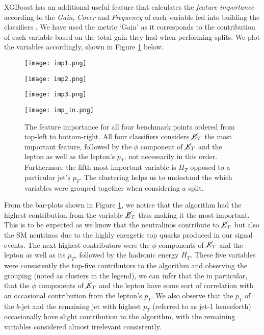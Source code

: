 XGBoost has an additional useful feature that calculates the \textit{feature importance} according to the \textit{Gain}, \textit{Cover} and \textit{Frequency} of each variable fed into building the classifiers \cite{xgboost}. We have used the metric `Gain' as it corresponds to the contribution of each variable based on the total gain they had when performing splits. We plot the variables accordingly, shown in Figure \ref{fig:imps} below. \\

\begin{figure}[htbp]
\centering
  \begin{minipage}[htbp]{0.49\textwidth}
    \centering
    \texttt{[image: imp1.png]}
  \end{minipage}
  \hfill
  \begin{minipage}[htbp]{0.49\textwidth}
    \centering
    \texttt{[image: imp2.png]}
  \end{minipage}
  \hfill
  \begin{minipage}[htbp]{0.49\textwidth}
    \centering
    \texttt{[image: imp3.png]}
  \end{minipage}
  \hfill
  \begin{minipage}[htbp]{0.49\textwidth}
    \centering
    \texttt{[image: imp\_in.png]}
  \end{minipage}
  \caption{The feature importance for all four benchmark points ordered from top-left to bottom-right. All four classifiers considers $\cancel{\it{E}}_{T}$ the most important feature, followed by the $\phi$ component of $\cancel{\it{E}}_{T}$ and the lepton as well as the lepton's $p_T$, not necessarily in this order. Furthermore the fifth most important variable is $H_T$ opposed to a particular jet's $p_T$. The clustering helps us to undestand the which variables were grouped together when considering a split.}
  \label{fig:imps}
\end{figure}

From the bar-plots shown in Figure \ref{fig:imps}, we notice that the algorithm had the highest contribution from the variable $\cancel{\it{E}}_{T}$ thus making it the most important. This is to be expected as we know that the neutralinos contribute to $\cancel{\it{E}}_{T}$ but also the SM neutrinos due to the highly energetic top quarks produced in our signal events. The next highest contributors were the $\phi$ components of $\cancel{\it{E}}_{T}$ and the lepton as well as its $p_T$, followed by the hadronic energy $H_T$. These five variables were consistently the top-five contributors to the algorithm and observing the grouping (noted as clusters in the legend), we can infer that the in particular, that the $\phi$ components of $\cancel{\it{E}}_{T}$ and the lepton have some sort of correlation with an occasional contribution from the lepton's $p_T$. We also observe that the $p_T$ of the $b$-jet and the remaining jet with highest $p_T$ (referred to as jet-1 henceforth) occasionally have slight contribution to the algorithm, with the remaining variables considered almost irrelevant consistently.
